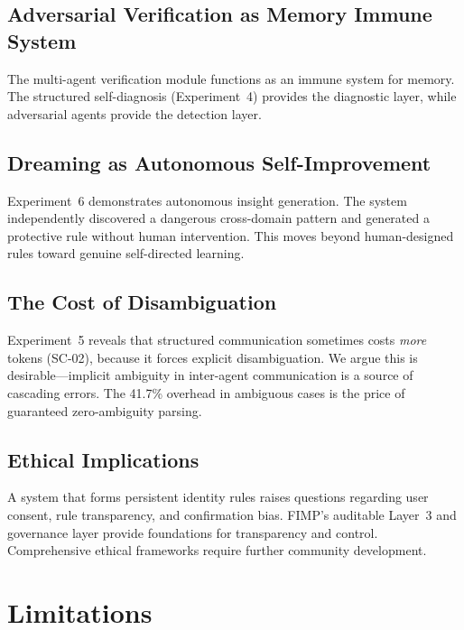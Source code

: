 \documentclass[11pt,a4paper]{article}
\begin{document}
\subsection{Adversarial Verification as Memory Immune System}

The multi-agent verification module functions as an immune system for memory. The structured
self-diagnosis (Experiment~4) provides the diagnostic layer, while adversarial agents
provide the detection layer.

\subsection{Dreaming as Autonomous Self-Improvement}

Experiment~6 demonstrates autonomous insight generation. The system independently discovered
a dangerous cross-domain pattern and generated a protective rule without human intervention.
This moves beyond human-designed rules toward genuine self-directed learning.

\subsection{The Cost of Disambiguation}

Experiment~5 reveals that structured communication sometimes costs \emph{more} tokens (SC-02),
because it forces explicit disambiguation. We argue this is desirable---implicit ambiguity in
inter-agent communication is a source of cascading errors. The 41.7\% overhead in ambiguous
cases is the price of guaranteed zero-ambiguity parsing.

\subsection{Ethical Implications}

A system that forms persistent identity rules raises questions regarding user consent, rule
transparency, and confirmation bias. FIMP's auditable Layer~3 and governance layer provide
foundations for transparency and control. Comprehensive ethical frameworks require further
community development.

\section{Limitations}
\end{document}
